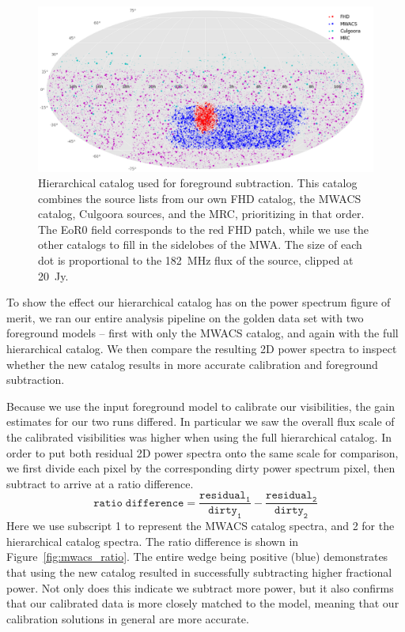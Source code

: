 \documentclass[iop]{emulateapj}
\begin{document}
\begin{figure}
\begin{center}
\includegraphics[width=\textwidth]{master_catalog.png}
\caption{
Hierarchical catalog used for foreground subtraction. This catalog combines the source lists 
from our own FHD catalog, the MWACS catalog, Culgoora sources, and the MRC, 
prioritizing in that order. The EoR0 field corresponds to the red FHD patch, while we use the 
other catalogs to fill in the sidelobes of the MWA. The size of each dot is proportional to the 
182~MHz flux of the source, clipped at 20~Jy.
\label{fig:master_catalog}
}
\end{center}
\end{figure}

To show the effect our hierarchical catalog has on the power spectrum figure of merit, we 
ran our entire analysis pipeline on the golden data set with two foreground models -- first 
with only the MWACS catalog, and again with the full hierarchical catalog. We then 
compare the resulting 2D power spectra to inspect whether the new catalog results in more 
accurate calibration and foreground subtraction.

Because we use the input foreground model to calibrate our visibilities, the gain estimates 
for our two runs differed. In particular we saw the overall flux scale of the calibrated 
visibilities was higher when using the full hierarchical catalog. In order to put both residual 
2D power spectra onto the same scale for comparison, we first divide each pixel by the 
corresponding dirty power spectrum pixel, then subtract to arrive at a ratio difference. 
\begin{equation}\label{eq:diff_ratio}
\mathtt{ratio\;difference = \frac{residual_1}{dirty_1} - \frac{residual_2}{dirty_2}}
\end{equation}
Here we use subscript 1 to represent the MWACS catalog spectra, and 2 for the 
hierarchical catalog spectra. The ratio difference is shown in Figure~\ref{fig:mwacs_ratio}. 
The entire wedge being positive (blue) demonstrates that using the new catalog resulted in 
successfully subtracting higher fractional power. Not only does this indicate we subtract 
more power, but it also confirms that our calibrated data is more closely matched to the 
model, meaning that our calibration solutions in general are more accurate.
\end{document}
